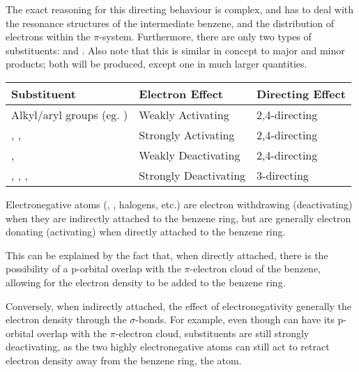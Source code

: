 			The exact reasoning for this directing behaviour is complex, and has to deal with the resonance structures of the intermediate
			benzene, and the distribution of electrons within the $\pi$-system. Furthermore, there are only two types of substituents:
			 and . Also note that this is similar in concept to major and minor products; both
			will be produced, except one in much larger quantities.

			\begin{table}[htb]\renewcommand{\arraystretch}{1.5}\begin{center}
			\begin{tabu} to 0.9\textwidth { X[1.5,c,m] | X[c,m] | X[c,m] }

				Substituent                                 &   Electron Effect         &   Directing Effect    \\ \hline
				Alkyl/aryl groups (eg. )           &   Weakly Activating       &   2,4-directing       \\
				, ,              &   Strongly Activating     &   2,4-directing       \\
				\ch{-\Cl},                          &   Weakly Deactivating     &   2,4-directing       \\
				, , ,   &   Strongly Deactivating   &   3-directing         \\

			\end{tabu}\end{center}
			\end{table}\vspace{-1em}


			Electronegative atoms (, , halogens, etc.) are electron withdrawing (deactivating) when they are
			indirectly attached to the benzene ring, but are generally electron donating (activating) when directly attached to
			the benzene ring.

			This can be explained by the fact that, when directly attached, there is the possibility of a p-orbital overlap with the
			$\pi$-electron cloud of the benzene, allowing for the electron density to be added to the benzene ring.

			Conversely, when indirectly attached, the effect of electronegativity generally  the electron density
			through the $\sigma$-bonds. For example, even though  can have its p-orbital overlap with the $\pi$-electron cloud,
			 substituents are still strongly deactivating, as the two highly electronegative  atoms can still act
			to retract electron density away from the benzene ring,  the  atom.

